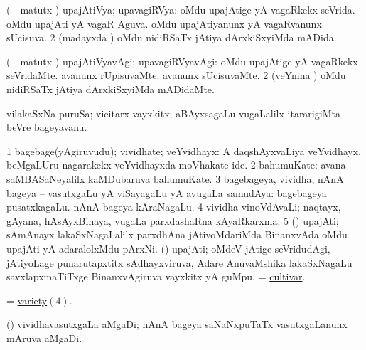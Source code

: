 \bentry
{} 
\gl{\gu}
\expl{}
\bmng
\bnum
{} (\kanmu\ \savi\ matutx \pArxvi) upajAtiVya; upavagiRVya: 
\banum
{} oMdu upajAtige yA vagaRkekx seVrida. 
 oMdu upajAti yA vagaR Aguva. 
 oMdu upajAtiyanunx yA vagaRvanunx sUcisuva. 
\eanum
\numie
\num{2} (madayxda \vi) oMdu nidiRSaTx jAtiya dArxkiSxyiMda mADida. 
\enum
\emng
\eentry

\bentry
{} 
\gl{\kirxvi}
\expl{}
\bmng
\bnum
{} (\kanmu\ \savi\ matutx \pArxvi) upajAtiVyavAgi; upavagiRVyavAgi: 
\banum
{} oMdu upajAtige yA vagaRkekx seVridaMte. 
 avanunx rUpisuvaMte. 
 avanunx sUcisuvaMte. 
\eanum
\numie
\num{2} (veYnina \vi) oMdu nidiRSaTx jAtiya dArxkiSxyiMda mADidaMte. 
\enum
\emng
\eentry

\bentry
{} 
\gl{\nA}
\expl{}
\bmng
 vilakaSxNa puruSa; vicitarx vayxkitx; aBAyxsagaLu \mo vugaLalilx itararigiMta beVre bageyavanu. 
\emng
\eentry

\bentry
{} 
\gl{\nA}
\bmng
\bnum
\num{1} bagebage(yAgiruvudu); vividhate; veYvidhayx:   A daqshAyxvaLiya veYvidhayx.  beMgaLUru nagarakekx veYvidhayxda moVhakate ide. 
\num{2} bahumuKate:  avana saMBASaNeyalilx kaMDubaruva bahumuKate. 
\num{3} bagebageya, vividha, nAnA bageya -- vasutxgaLu yA viSayagaLu yA avugaLa samudAya:  bagebageya pusatxkagaLu.  nAnA bageya kAraNagaLu. 
\hypertarget{variety(4)}{} 
\num{4} vividha vinoVdAvaLi; naqtayx, gAyana, hAsAyxBinaya, \mo vugaLa parxdashaRna kAyaRkarxma. 
\num{5} (\jiVvi) upajAti; sAmAnayx lakaSxNagaLalilx parxdhAna jAtivoMdariMda BinanxvAda oMdu upajAti yA adaralolxMdu pArxNi. 
 (\jiVvi) 
\banum
{} upajAti; oMdeV jAtige seVridudAgi, jAtiyoLage punarutapxtitx sAdhayxviruva, Adare AnuvaMshika lakaSxNagaLu savxlapxmaTiTxge BinanxvAgiruva vayxkitx yA guMpu. 
 = \hyperref{kandict_c.pdf}{C}{cultivar}{cultivar}. 
\eanum
\numie
\enum
\emng
\eentry

\bentry
{}
\gl{\nA}
\expl{}
\bmng
 = \hyperlink{variety(4)}{variety\((4)\)}. 
\emng
\eentry

\bentry
{}
\gl{\nA}
\expl{}
\bmng
 (\ame) vividhavasutxgaLa aMgaDi; nAnA bageya saNaNxpuTaTx vasutxgaLanunx mAruva aMgaDi. 
\emng
\eentry

